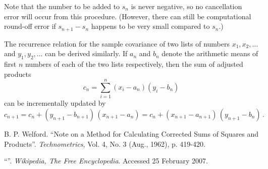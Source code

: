 \documentclass[12pt]{article}
\begin{document}
Note that the number to be added to $s_n$ is never negative,
so no cancellation error will occur from this procedure.
(However, there can still be computational round-off error if $s_{n+1} - s_n$
happens to be very small compared to $s_n$.)

\medskip

The recurrence relation for the 
sample covariance of two lists of numbers $x_1, x_2, \dotsc$
and $y_1, y_2, \dotsc$
can be derived similarly.
If $a_n$ and $b_n$ denote the arithmetic means
of first $n$ numbers of each of the two lists respectively,
then the sum of adjusted products
\[
c_n = \sum_{i=1}^n (x_i - a_n)(y_i - b_n)
\]
can be incrementally updated by
\[
c_{n+1} = c_n + (y_{n+1} - b_{n+1}) \, (x_{n+1} - a_n)
= c_n + (x_{n+1} - a_{n+1}) \, (y_{n+1} - b_n)\,.
\]

\begin{thebibliography}{3}
B. P. Welford. ``Note on a Method for Calculating Corrected Sums of Squares and Products''. {\it Technometrics}, Vol. 4, No. 3 (Aug., 1962), p. 419-420.

``''. {\it Wikipedia, The Free Encyclopedia}.  Accessed 25 February 2007.
\end{thebibliography}

\end{document}
